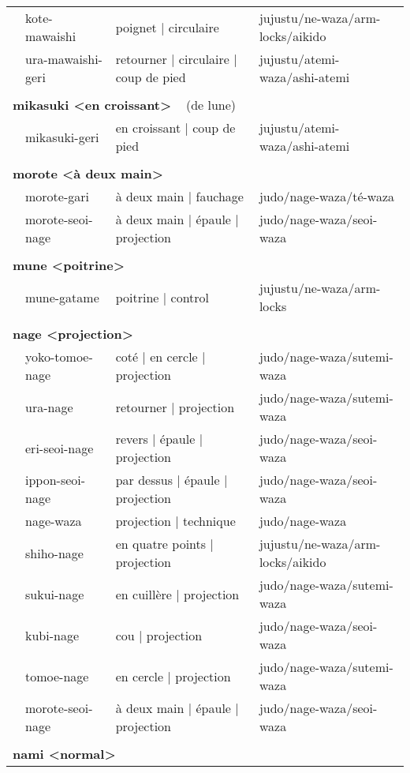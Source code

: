\documentclass{article}%
\begin{document}
\begin{longtable}{rlll}
&kote{-}mawaishi&poignet | circulaire&jujustu/ne{-}waza/arm{-}locks/aikido\\%
&ura{-}mawaishi{-}geri&retourner | circulaire | coup de pied&jujustu/atemi{-}waza/ashi{-}atemi\\%
&&&\\%
\multicolumn{3}{l}{\textbf{mikasuki <en croissant>}%
~%
(de lune)}&\\%
&mikasuki{-}geri&en croissant | coup de pied&jujustu/atemi{-}waza/ashi{-}atemi\\%
&&&\\%
\multicolumn{3}{l}{\textbf{morote <à deux main>}%
~%
}&\\%
&morote{-}gari&à deux main | fauchage&judo/nage{-}waza/té{-}waza\\%
&morote{-}seoi{-}nage&à deux main | épaule | projection&judo/nage{-}waza/seoi{-}waza\\%
&&&\\%
\multicolumn{3}{l}{\textbf{mune <poitrine>}%
~%
}&\\%
&mune{-}gatame&poitrine | control&jujustu/ne{-}waza/arm{-}locks\\%
&&&\\%
\multicolumn{3}{l}{\textbf{nage <projection>}%
~%
}&\\%
&yoko{-}tomoe{-}nage&coté | en cercle | projection&judo/nage{-}waza/sutemi{-}waza\\%
&ura{-}nage&retourner | projection&judo/nage{-}waza/sutemi{-}waza\\%
&eri{-}seoi{-}nage&revers | épaule | projection&judo/nage{-}waza/seoi{-}waza\\%
&ippon{-}seoi{-}nage&par dessus | épaule | projection&judo/nage{-}waza/seoi{-}waza\\%
&nage{-}waza&projection | technique&judo/nage{-}waza\\%
&shiho{-}nage&en quatre points | projection&jujustu/ne{-}waza/arm{-}locks/aikido\\%
&sukui{-}nage&en cuillère | projection&judo/nage{-}waza/sutemi{-}waza\\%
&kubi{-}nage&cou | projection&judo/nage{-}waza/seoi{-}waza\\%
&tomoe{-}nage&en cercle | projection&judo/nage{-}waza/sutemi{-}waza\\%
&morote{-}seoi{-}nage&à deux main | épaule | projection&judo/nage{-}waza/seoi{-}waza\\%
&&&\\%
\multicolumn{3}{l}{\textbf{nami <normal>}%
~%
}&\\%

\end{longtable}
\end{document}
